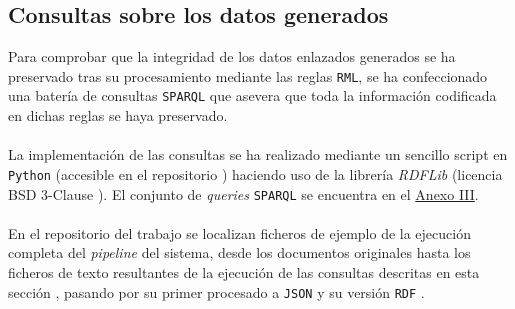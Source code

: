     \subsection{Consultas sobre los datos generados} \label{subsec:rdflib}
        Para comprobar que la integridad de los datos enlazados generados se ha preservado tras su procesamiento mediante las reglas \texttt{RML}, se ha confeccionado una batería de consultas \texttt{SPARQL} que asevera que toda la información codificada en dichas reglas se haya preservado.
        \\ \\
        La implementación de las consultas se ha realizado mediante un sencillo script en \texttt{Python} (accesible en el repositorio \cite{SCRIPTRDF}) haciendo uso de la librería \textit{RDFLib} (licencia BSD 3-Clause \cite{LICBSD3}). El conjunto de \textit{queries} \texttt{SPARQL} se encuentra en el \hyperref[annex:sparql]{Anexo III}.
        \\ \\
        En el repositorio del trabajo se localizan ficheros de ejemplo de la ejecución completa del \textit{pipeline} del sistema, desde los documentos originales \cite{TFGEJ1} hasta los ficheros de texto resultantes de la ejecución de las consultas descritas en esta sección \cite{TFGEJ2}, pasando por su primer procesado a \texttt{JSON} \cite{TFGEJ3} y su versión \texttt{RDF} \cite{TFGEJ4}.
        
